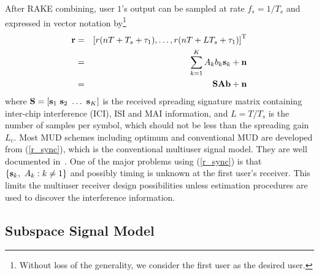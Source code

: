 \documentclass[conference]{IEEEtran}
\newcommand{\br}{{\mathbf r}}
\newcommand{\bA}{{\mathbf A}}
\newcommand{\bb}{{\bf b}}
\newcommand{\bs}{{\bf s}}
\newcommand{\bn}{{\bf n}}
\newcommand{\bS}{{\bf S}}
\begin{document}
After RAKE combining,  user $1$'s output can be sampled at rate
$f_s=1/T_s$ and expressed in vector notation by\footnote{Without loss of
the generality, we consider the first user as the desired user.}
\begin{eqnarray}
\br & = & \left[ r(nT+T_s+\tau_1),\ldots,r(nT+LT_s+\tau_1) \right]^{\rm
T} \nonumber \\
 &=&\sum\limits_{k=1}^{K} A_k b_k \bs_k + \bn \nonumber \\
 &=&\bS \bA \bb + \bn
 \label{r_sync}
\end{eqnarray}
where $\bS=[\bs_1\ \bs_2\ \ldots\ \bs_K]$ is the
received spreading signature matrix containing inter-chip
interference (ICI), ISI and MAI information, and $L=T/T_s$ is the number of
samples per symbol, which should not be less than the spreading gain $L_c$.
Most MUD schemes including optimum and conventional MUD are developed from
(\ref{r_sync}), which is the conventional multiuser signal
model. They are well documented in~\cite{Verd98}. One of the major
problems using (\ref{r_sync}) is that $\left\{\bs_k,\
A_k:k\neq1\right\}$ and possibly timing is unknown at the first user's
receiver.  This limits the multiuser receiver design possibilities unless estimation procedures are used to discover the interference information.

\subsection{Subspace Signal Model}
\end{document}
